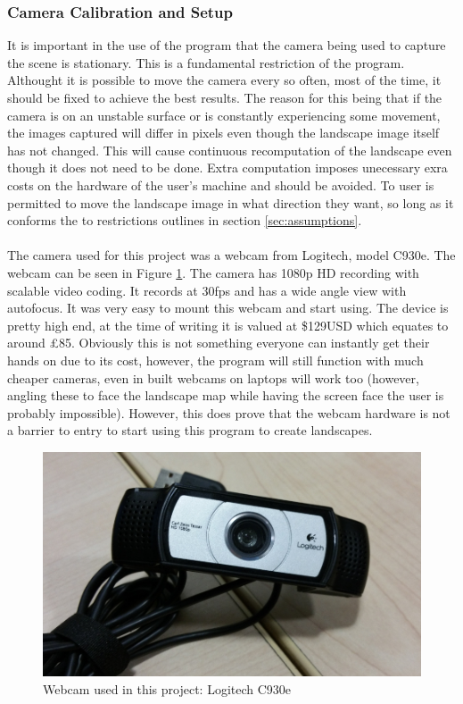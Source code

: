 \documentclass[11pt]{article}
\begin{document}
\subsubsection{Camera Calibration and Setup}
It is important in the use of the program that the camera being used to
capture the scene is stationary. This is a fundamental restriction of the 
program. Althought it is possible to move the camera every so often,
most of the time, it should be fixed to achieve the best results. The reason
for this being that if the camera is on an unstable surface or is constantly
experiencing some movement, the images captured will differ in pixels even though
the landscape image itself has not changed. This will cause continuous
recomputation of the landscape even though it does not need to be done. Extra
computation imposes unecessary exra costs on the hardware of the user's machine
and should be avoided. To user is permitted to move the landscape image in 
what direction they want, so long as it conforms the to restrictions
outlines in section \ref{sec:assumptions}.\\
\\
The camera used for this project was a webcam from Logitech, model C930e.
The webcam can be seen in Figure \ref{webcam}. The camera has 1080p HD 
recording with scalable video coding. It records at 30fps and has a wide 
angle view with autofocus. It was very easy to mount this webcam and start
using. The device is pretty high end, at the time of writing it is valued
at \$129USD which equates to around £85. Obviously this is not something
everyone can instantly get their hands on due to its cost, however, the
program will still function with much cheaper cameras, even in built
webcams on laptops will work too (however, angling these to face the 
landscape map while having the screen face the user is probably impossible).
However, this does prove that the webcam hardware is not a barrier to 
entry to start using this program to create landscapes. 

\begin{figure}
	\centering
	\includegraphics[scale=0.6]{pics/camera.jpg}
	\caption{Webcam used in this project: Logitech C930e}
	\label{webcam}
\end{figure}
\end{document}
